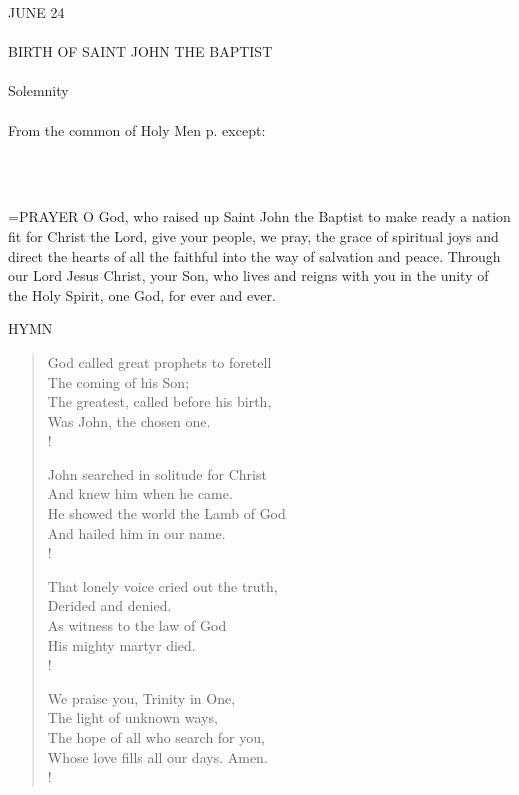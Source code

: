\begin{center}\normalsize \begin{center}\normalsize JUNE 24\\\\
\footnotesize \footnotesize BIRTH OF SAINT JOHN THE BAPTIST\\\\
\footnotesize \footnotesize Solemnity\\\\
\footnotesize \footnotesize From the common of Holy Men p.     except:\\\\
\footnotesize \end{center}\\
\end{center}

\hangindent=\parindent \small{PRAYER 
O God, who raised up Saint John the Baptist
to make ready a nation fit for Christ the Lord,
give your people, we pray,
the grace of spiritual joys
and direct the hearts of all the faithful
into the way of salvation and peace.
Through our Lord Jesus Christ, your Son,
who lives and reigns with you in the unity of the Holy Spirit,
one God, for ever and ever.\\}
 
\noindent\small{\uppercase{Hymn}}\normalsize\label{proper:johnthebaptist:hymn}
\begin{verse}
God called great prophets to foretell\\
The coming of his Son;\\
The greatest, called before his birth,\\
Was John, the chosen one.\\!

John searched in solitude for Christ\\
And knew him when he came.\\
He showed the world the Lamb of God\\
And hailed him in our name.\\!

That lonely voice cried out the truth,\\
Derided and denied.\\
As witness to the law of God\\
His mighty martyr died.\\!

We praise you, Trinity in One,\\
The light of unknown ways,\\
The hope of all who search for you,\\
Whose love fills all our days. Amen.\\!
\end{verse}

